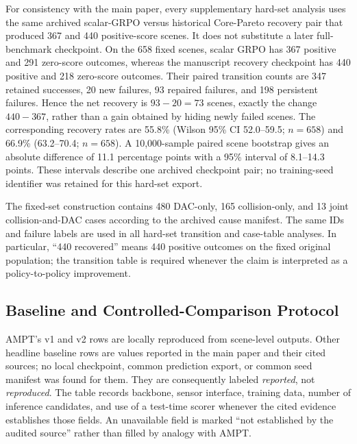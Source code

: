 For consistency with the main paper, every supplementary hard-set analysis
uses the same archived scalar-GRPO versus historical Core-Pareto recovery pair that produced
367 and 440 positive-score scenes.  It does not substitute a later
full-benchmark checkpoint.  On the 658 fixed scenes, scalar GRPO has 367
positive and 291 zero-score outcomes, whereas the manuscript recovery
checkpoint has 440 positive and 218 zero-score outcomes.  Their paired
transition counts are 347 retained successes, 20 new failures, 93 repaired
failures, and 198 persistent failures.  Hence the net recovery is
$93-20=73$ scenes, exactly the change $440-367$, rather than a gain obtained by
hiding newly failed scenes.  The corresponding recovery rates are 55.8\%
(Wilson 95\% CI 52.0--59.5; $n=658$) and 66.9\% (63.2--70.4; $n=658$).  A
10,000-sample paired scene bootstrap gives an absolute difference of 11.1
percentage points with a 95\% interval of 8.1--14.3 points.
These intervals describe one archived checkpoint pair; no training-seed
identifier was retained for this hard-set export.

The fixed-set construction contains 480 DAC-only, 165 collision-only, and 13
joint collision-and-DAC cases according to the archived cause manifest.  The
same IDs and failure labels are used in all hard-set transition and case-table
analyses.  In particular, ``440 recovered'' means 440 positive outcomes on the
fixed original population; the transition table is required whenever the
claim is interpreted as a policy-to-policy improvement.

\subsection{Baseline and Controlled-Comparison Protocol}
\label{sec:baseline-protocol}



AMPT's v1 and v2 rows are locally reproduced from scene-level outputs.  Other
headline baseline rows are values reported in the main paper and their cited
sources; no local checkpoint, common prediction export, or common seed manifest
was found for them.  They are consequently labeled \emph{reported}, not
\emph{reproduced}.  The table records backbone, sensor interface, training
data, number of inference candidates, and use of a test-time scorer whenever
the cited evidence establishes those fields.  An unavailable field is marked
``not established by the audited source'' rather than filled by analogy with
AMPT.

